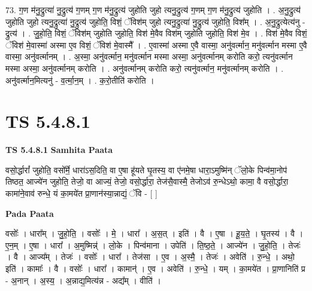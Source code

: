 \documentclass[17pt]{extarticle}
\begin{document}
73. ग॒ण म॑नु॒द्रुत्या॑ नु॒द्रुत्य॑ ग॒णम् ग॒ण म॑नु॒द्रुत्य॑ जुहोति जुहो त्यनु॒द्रुत्य॑ ग॒णम् ग॒ण म॑नु॒द्रुत्य॑ जुहोति । . अ॒नु॒द्रुत्य॑ जुहोति जुहो त्यनु॒द्रुत्या॑ नु॒द्रुत्य॑ जुहोति॒ विशं॒ ॅविश॑म् जुहो त्यनु॒द्रुत्या॑ नु॒द्रुत्य॑ जुहोति॒ विश᳚म् । . अ॒नु॒द्रुत्येत्य॑नु - द्रुत्य॑ । . जु॒हो॒ति॒ विशं॒ ॅविश॑म् जुहोति जुहोति॒ विश॑ मे॒वैव विश॑म् जुहोति जुहोति॒ विश॑ मे॒व । . विश॑ मे॒वैव विशं॒ ॅविश॑ मे॒वास्मा॑ अस्मा ए॒व विशं॒ ॅविश॑ मे॒वास्मै᳚ । . ए॒वास्मा॑ अस्मा ए॒वै वास्मा॒ अनु॑वर्त्मान॒ मनु॑वर्त्मान मस्मा ए॒वै वास्मा॒ अनु॑वर्त्मानम् । . अ॒स्मा॒ अनु॑वर्त्मान॒ मनु॑वर्त्मान मस्मा अस्मा॒ अनु॑वर्त्मानम् करोति करो॒ त्यनु॑वर्त्मान मस्मा अस्मा॒ अनु॑वर्त्मानम् करोति । . अनु॑वर्त्मानम् करोति करो॒ त्यनु॑वर्त्मान॒ मनु॑वर्त्मानम् करोति । . अनु॑वर्त्मान॒मित्यनु॑ - व॒र्त्मा॒न॒म् । . क॒रो॒तीति॑ करोति । \newline
\pagebreak
{}

\section{ TS 5.4.8.1 }

\textbf{TS 5.4.8.1 } \newline
\textbf{Samhita Paata} \newline

वसो॒र्द्धारां᳚ जुहोति॒ वसो᳚र्मे॒ धारा॑ऽस॒दिति॒ वा ए॒षा हू॑यते घृ॒तस्य॒ वा ए॑नमे॒षा धारा॒ऽमुष्मि॑न् ॅलो॒के पिन्व॑मा॒नोप॑ तिष्ठत॒ आज्ये॑न जुहोति॒ तेजो॒ वा आज्यं॒ तेजो॒ वसो॒र्द्धारा॒ तेज॑सै॒वास्मै॒ तेजोऽव॑ रु॒न्धेऽथो॒ कामा॒ वै वसो॒र्द्धारा॒ कामा॑ने॒वाव॑ रुन्धे॒ यं का॒मये॑त प्रा॒णान॑स्या॒न्नाद्यं॒ ॅवि - [  ] \newline

\textbf{Pada Paata} \newline

वसोः᳚ । धारा᳚म् । जु॒हो॒ति॒ । वसोः᳚ । मे॒ । धारा᳚ । अ॒स॒त् । इति॑ । वै । ए॒षा । हू॒य॒ते॒ । घृ॒तस्य॑ । वै । ए॒न॒म् । ए॒षा । धारा᳚ । अ॒मुष्मिन्न्॑ । लो॒के । पिन्व॑माना । उपेति॑ । ति॒ष्ठ॒ते॒ । आज्ये॑न । जु॒हो॒ति॒ । तेजः॑ । वै । आज्य᳚म् । तेजः॑ । वसोः᳚ । धारा᳚ । तेज॑सा । ए॒व । अ॒स्मै॒ । तेजः॑ । अवेति॑ । रु॒न्धे॒ । अथो॒ इति॑ । कामाः᳚ । वै । वसोः᳚ । धारा᳚ । कामान्॑ । ए॒व । अवेति॑ । रु॒न्धे॒ । यम् । का॒मये॑त । प्रा॒णानिति॑ प्र - अ॒नान् । अ॒स्य॒ । अ॒न्नाद्य॒मित्य॑न्न - अद्य᳚म् । वीति॑ ।  \newline
\end{document}
